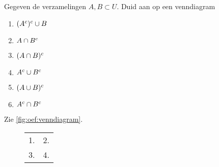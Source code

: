 \begin{oef} \label{oef:venndiagram}
Gegeven de verzamelingen $A,B\subset U$. Duid aan op een venndiagram
\begin{enumerate}
  \item $(A^c)^c \cup B$
  \item $A\cap  B^c$
  \item $(A\cap B)^c$
  \item $A^c \cup  B^c$
  \item $(A\cup B)^c$
  \item $A^c \cap B^c$
\end{enumerate}

\begin{opl}
Zie \cref{fig:oef:venndiagram}.
\begin{figure}
{
\def\labels{
  \node[anchor=south east] at (-1.55,.6) {$A$};
  \node[anchor=south west] at (1.55,.6) {$B$};
}
\def\universe{(-2.5,-1.5) rectangle +(5,3)}
\def\ellA{(-.9,0) ellipse (1.25cm and 0.75cm)}
\def\ellB{(.9,0) ellipse (1.25cm and 0.75cm)}

\begin{center}
\begin{tabular}{cc}
  1.
  \begin{tikzpicture}
    \draw[thick] \universe;
    \draw[highlight] \ellA;
    \draw[highlight] \ellB;
    \draw[outline] \ellA;
    \labels
  \end{tikzpicture}
  &
  2.
  \begin{tikzpicture}
    \draw[thick] \universe;
    \draw[highlight] \ellA;
    \draw[empty] \ellB;
    \draw[outline] \ellA;
    \labels
  \end{tikzpicture}
  \\
  3.
  \begin{tikzpicture}
    \draw[thick,highlight] \universe;
    \begin{scope}
      \clip \ellA;
      \clip \ellB;
      \draw[empty] \ellA;
    \end{scope}

    \draw[outline] \ellA;
    \draw[outline] \ellB;
    \labels
  \end{tikzpicture}
  &
  4.
  \begin{tikzpicture}
    \draw[thick,highlight] \universe;
    \begin{scope}
      \clip \ellA;
      \clip \ellB;
      \draw[empty] \ellA;
    \end{scope}


\end{tikzpicture}
\end{tabular}
\end{center}}
\end{figure}
\end{opl}
\end{oef}
